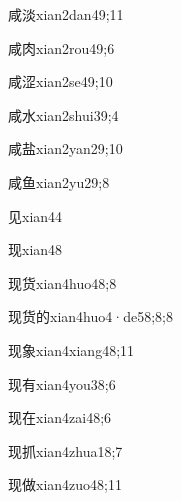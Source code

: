 \begin{verbete}{咸淡}{xian2dan4}{9;11}
\end{verbete}
\begin{verbete}{咸肉}{xian2rou4}{9;6}
\end{verbete}
\begin{verbete}{咸涩}{xian2se4}{9;10}
\end{verbete}
\begin{verbete}{咸水}{xian2shui3}{9;4}
\end{verbete}
\begin{verbete}{咸盐}{xian2yan2}{9;10}
\end{verbete}
\begin{verbete}{咸鱼}{xian2yu2}{9;8}
\end{verbete}
\begin{verbete}{见}{xian4}{4}
\end{verbete}
\begin{verbete}{现}{xian4}{8}
\end{verbete}
\begin{verbete}{现货}{xian4huo4}{8;8}
\end{verbete}
\begin{verbete}{现货的}{xian4huo4·de5}{8;8;8}
\end{verbete}
\begin{verbete}{现象}{xian4xiang4}{8;11}
\end{verbete}
\begin{verbete}{现有}{xian4you3}{8;6}
\end{verbete}
\begin{verbete}{现在}{xian4zai4}{8;6}
\end{verbete}
\begin{verbete}{现抓}{xian4zhua1}{8;7}
\end{verbete}
\begin{verbete}{现做}{xian4zuo4}{8;11}
\end{verbete}
